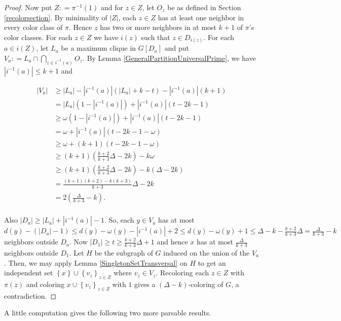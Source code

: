 \documentclass[12pt]{article}
\theoremstyle{plain}
\theoremstyle{definition}
\theoremstyle{remark}
\newcommand{\set}[1]{\left\{ #1 \right\}}
\newcommand{\card}[1]{\left|#1\right|}
\newcommand{\parens}[1]{\left( #1 \right)}
\newcommand{\DefinedAs}{\mathrel{\mathop:}=}
\begin{document}
\begin{proof}
Now put $Z \DefinedAs \pi^{-1}(1)$ and for $z \in Z$, let $O_z$ be as defined
in Section \ref{recolorsection}.  By minimality of $\card{Z}$, each $z \in Z$ has at least one neighbor in every color class of $\pi$.  
Hence $z$ has two or more neighbors in at most $k+1$ of
$\pi$'s color classes. For each $z \in Z$ we have $i(z)$ such that $z \in D_{i(z)}$.  For each $a \in i(Z)$, let $L_a$ be a maximum clique in $G[D_a]$ and put $V_a \DefinedAs L_a \cap \bigcap_{z \in i^{-1}(a)} O_z$.  By Lemma \ref{GeneralPartitionUniversalPrime}, we have $\card{i^{-1}(a)} \leq k+1$ and

\begin{align*}
\card{V_a} &\geq \card{L_a} - \card{i^{-1}(a)}(\card{L_a} + k - t) - \card{i^{-1}(a)}(k + 1) \\
&= \card{L_a}(1-\card{i^{-1}(a)}) + \card{i^{-1}(a)}(t - 2k - 1) \\
&\geq \omega(1-\card{i^{-1}(a)}) + \card{i^{-1}(a)}(t - 2k - 1) \\
&= \omega + \card{i^{-1}(a)}(t - 2k - 1 - \omega) \\
&\geq \omega + (k+1)(t - 2k - 1 - \omega) \\
&\geq (k+1)(\frac{k+2}{k+3}\Delta - 2k) - k\omega \\
&\geq (k+1)(\frac{k+2}{k+3}\Delta - 2k) - k(\Delta - 2k) \\
&= \frac{(k+1)(k+2) - k(k+3)}{k+3}\Delta - 2k \\
&= 2\parens{\frac{\Delta}{k+3} - k}. \\
\end{align*}

Also $\card{D_a} \geq \card{L_a} + \card{i^{-1}(a)} - 1$. So, each $y \in V_a$ has at most $d(y) - (\card{D_a} - 1) \leq d(y) - \omega(y) - \card{i^{-1}(a)} + 2 \leq d(y) - \omega(y) + 1 \leq \Delta - k - \frac{k+2}{k+3}\Delta = \frac{\Delta}{k+3} - k$ neighbors outside $D_a$.  Now $\card{D_1} \geq t \geq \frac{k+2}{k+3}\Delta + 1$ and hence $x$ has at most $\frac{\Delta}{k+3}$ neighbors outside $D_1$.  Let $H$ be the subgraph of $G$ induced on the union of the $V_a$. Then, we may apply Lemma
\ref{SingletonSetTransversal} on $H$ to get an independent set $\set{x} \cup \set{v_z}_{z\in Z}$ where $v_z \in V_z$. Recoloring each $z \in Z$ with $\pi(z)$ and
coloring $x \cup \set{v_z}_{z \in Z}$ with $1$ gives a $(\Delta - k)$-coloring
of $G$, a contradiction.
\end{proof}

A little computation gives the following two more parsable results.
\end{document}

